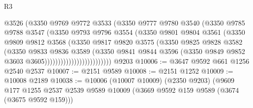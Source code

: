\begin{lexlean}{R3}
\begin{coremodule}
                                @3526
                                (@3350
                                  @9769
                                  @9772
                                  @3533
                                  (@3350
                                    @9777
                                    @9780
                                    @3540
                                    (@3350
                                      @9785
                                      @9788
                                      @3547
                                      (@3350
                                        @9793
                                        @9796
                                        @3554
                                        (@3350
                                          @9801
                                          @9804
                                          @3561
                                          (@3350
                                            @9809
                                            @9812
                                            @3568
                                            (@3350
                                              @9817
                                              @9820
                                              @3575
                                              (@3350
                                                @9825
                                                @9828
                                                @3582
                                                (@3350
                                                  @9833
                                                  @9836
                                                  @3589
                                                  (@3350
                                                    @9841
                                                    @9844
                                                    @3596
                                                    (@3350
                                                      @9849
                                                      @9852
                                                      @3603
                                                      @3605)))))))))))))))))))))))))
    @9203
@10006 := @3647 @9592 @661 @1256 @2540 @2537
@10007 := @2151 @9589
@10008 := @2151 @1252
@10009 := @10008 @2189
@10038 := @10006
    (@10007 @10009)
    (@2350 @9203)
    (@9609
      @177
      @1255
      @2537
      @2539
      @9589
      @10009
      (@3669 @9592 @159 @9589 (@3674 (@3675 @9592 @159)))

\end{coremodule}
\end{lexlean}
